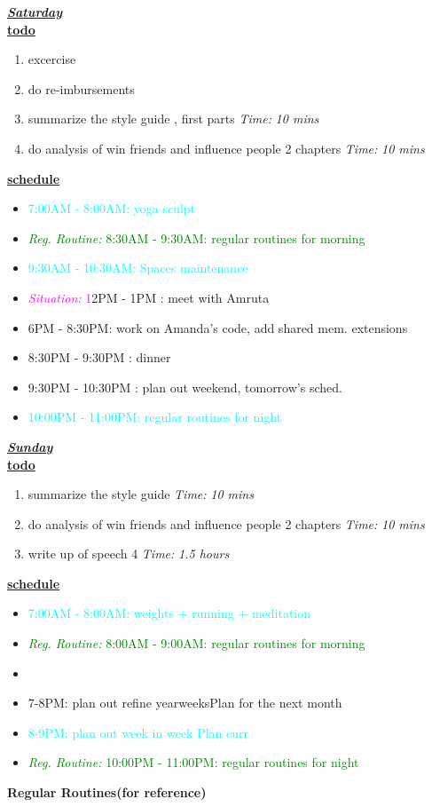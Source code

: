 \documentclass[11pt]{article}
\newcommand{\timeEst}[1]{\textit{Time:} \textit{#1}}
\newcommand{\regItem}[1]{\item \textcolor{cyan}{#1}}
\newcommand{\regRoutineItem}[1]{\item \textcolor{green}{\textit{Reg. Routine:} #1}}
\newcommand{\situationItem}[1]{\item \textcolor{magenta}{\textit{Situation:} #1}}
\begin{document}
\underline{\textbf{\textit{Saturday}}}\\
\underline{\textbf{todo}}\\
\begin{enumerate}
\item excercise
\item do re-imbursements
\item summarize the style guide , first parts \timeEst{10 mins}

\item do analysis of win friends and influence people 2 chapters \timeEst{10 mins}

\end{enumerate}

\underline{\textbf{schedule}}\\
\begin{itemize}
\regItem{7:00AM - 8:00AM: yoga sculpt}
\regRoutineItem {8:30AM - 9:30AM: regular routines for morning}
\regItem{9:30AM - 10:30AM: Spaces maintenance}
\situationItem 12PM - 1PM :  meet with Amruta
\item 6PM - 8:30PM: work on Amanda's code, add shared mem. extensions
\item 8:30PM - 9:30PM : dinner
\item 9:30PM - 10:30PM : plan out weekend, tomorrow's sched.
\regItem{10:00PM - 11:00PM: regular routines for night}
\end{itemize}

\underline{\textbf{\textit{Sunday}}}\\
\underline{\textbf{todo}}\\
\begin{enumerate}
\item summarize the style guide \timeEst{10 mins}
\item do analysis of win friends and influence people 2 chapters \timeEst{10 mins}
\item  write up of speech 4 \timeEst{1.5 hours}
\end{enumerate}


\underline{\textbf{schedule}}\\
\begin{itemize}
\regItem{7:00AM - 8:00AM: weights + running + meditation }
\regRoutineItem {8:00AM - 9:00AM: regular routines for morning}
\item
\item 7-8PM: plan out refine yearweeksPlan for the next month
\regItem{8-9PM:  plan out week in week Plan curr}
\regRoutineItem{10:00PM - 11:00PM: regular routines for night}
\end{itemize}

\newpage

\textbf{Regular Routines(for reference)}

\end{document}
